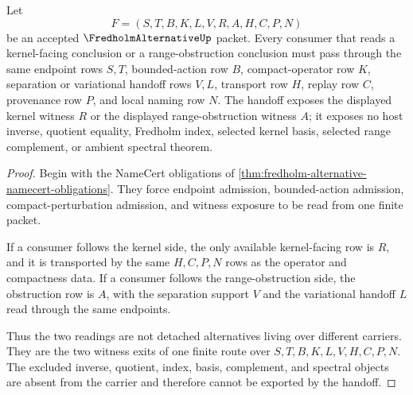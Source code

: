 \begin{theorem}
\label{thm:fredholm-alternative-kernel-cokernel-handoff}
Let
$$
F=(S,T,B,K,L,V,R,A,H,C,P,N)
$$
be an accepted $\FredholmAlternativeUp$ packet. Every consumer that reads a kernel-facing conclusion or a range-obstruction conclusion must pass through the same endpoint rows $S,T$, bounded-action row $B$, compact-operator row $K$, separation or variational handoff rows $V,L$, transport row $H$, replay row $C$, provenance row $P$, and local naming row $N$. The handoff exposes the displayed kernel witness $R$ or the displayed range-obstruction witness $A$; it exposes no host inverse, quotient equality, Fredholm index, selected kernel basis, selected range complement, or ambient spectral theorem.
\end{theorem}
\begin{proof}
Begin with the NameCert obligations of \autoref{thm:fredholm-alternative-namecert-obligations}. They force endpoint admission, bounded-action admission, compact-perturbation admission, and witness exposure to be read from one finite packet.

If a consumer follows the kernel side, the only available kernel-facing row is $R$, and it is transported by the same $H,C,P,N$ rows as the operator and compactness data. If a consumer follows the range-obstruction side, the obstruction row is $A$, with the separation support $V$ and the variational handoff $L$ read through the same endpoints.

Thus the two readings are not detached alternatives living over different carriers. They are the two witness exits of one finite route over $S,T,B,K,L,V,H,C,P,N$. The excluded inverse, quotient, index, basis, complement, and spectral objects are absent from the carrier and therefore cannot be exported by the handoff.
\end{proof}

